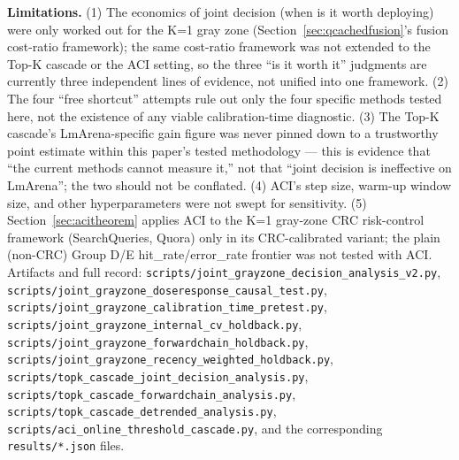 \documentclass[11pt]{article}
\begin{document}
\textbf{Limitations.} (1) The economics of joint decision (when is it worth deploying) were only worked out for the K=1 gray zone (Section~\ref{sec:qcachedfusion}'s fusion cost-ratio framework); the same cost-ratio framework was not extended to the Top-K cascade or the ACI setting, so the three ``is it worth it'' judgments are currently three independent lines of evidence, not unified into one framework. (2) The four ``free shortcut'' attempts rule out only the four specific methods tested here, not the existence of any viable calibration-time diagnostic. (3) The Top-K cascade's LmArena-specific gain figure was never pinned down to a trustworthy point estimate within this paper's tested methodology --- this is evidence that ``the current methods cannot measure it,'' not that ``joint decision is ineffective on LmArena''; the two should not be conflated. (4) ACI's step size, warm-up window size, and other hyperparameters were not swept for sensitivity. (5) Section~\ref{sec:acitheorem} applies ACI to the K=1 gray-zone CRC risk-control framework (SearchQueries, Quora) only in its CRC-calibrated variant; the plain (non-CRC) Group D/E hit\_rate/error\_rate frontier was not tested with ACI. Artifacts and full record: \texttt{scripts/\allowbreak{}joint\_\allowbreak{}grayzone\_\allowbreak{}decision\_\allowbreak{}analysis\_\allowbreak{}v2.\allowbreak{}py}, \texttt{scripts/\allowbreak{}joint\_\allowbreak{}grayzone\_\allowbreak{}doseresponse\_\allowbreak{}causal\_\allowbreak{}test.\allowbreak{}py}, \texttt{scripts/\allowbreak{}joint\_\allowbreak{}grayzone\_\allowbreak{}calibration\_\allowbreak{}time\_\allowbreak{}pretest.\allowbreak{}py}, \texttt{scripts/\allowbreak{}joint\_\allowbreak{}grayzone\_\allowbreak{}internal\_\allowbreak{}cv\_\allowbreak{}holdback.\allowbreak{}py}, \texttt{scripts/\allowbreak{}joint\_\allowbreak{}grayzone\_\allowbreak{}forwardchain\_\allowbreak{}holdback.\allowbreak{}py}, \texttt{scripts/\allowbreak{}joint\_\allowbreak{}grayzone\_\allowbreak{}recency\_\allowbreak{}weighted\_\allowbreak{}holdback.\allowbreak{}py}, \texttt{scripts/\allowbreak{}topk\_\allowbreak{}cascade\_\allowbreak{}joint\_\allowbreak{}decision\_\allowbreak{}analysis.\allowbreak{}py}, \texttt{scripts/\allowbreak{}topk\_\allowbreak{}cascade\_\allowbreak{}forwardchain\_\allowbreak{}analysis.\allowbreak{}py}, \texttt{scripts/\allowbreak{}topk\_\allowbreak{}cascade\_\allowbreak{}detrended\_\allowbreak{}analysis.\allowbreak{}py}, \texttt{scripts/\allowbreak{}aci\_\allowbreak{}online\_\allowbreak{}threshold\_\allowbreak{}cascade.\allowbreak{}py}, and the corresponding \texttt{results/\allowbreak{}*.\allowbreak{}json} files.
\end{document}
